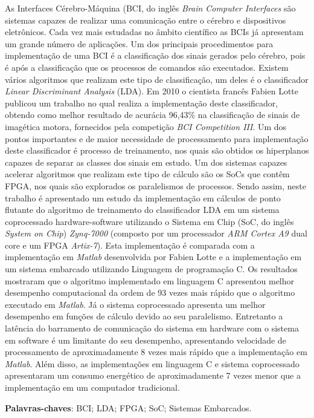 \begin{resumo}

As Interfaces Cérebro-Máquina (BCI, do inglês \textit{Brain Computer Interfaces} são sistemas capazes de realizar uma comunicação entre o cérebro e dispositivos eletrônicos. Cada vez mais estudadas no âmbito científico as BCIs já apresentam um grande número de aplicações. Um dos principais procedimentos para implementação de uma BCI é a classificação dos sinais gerados pelo cérebro, pois é após a classificação que os processos de comandos são executados. Existem vários algoritmos que realizam este tipo de classificação, um deles é o classificador \textit{Linear Discriminant  Analysis} (LDA). Em 2010 o cientista francês Fabien Lotte publicou um trabalho no qual realiza a implementação deste classificador, obtendo como melhor resultado de acurácia 96,43\% na classificação de sinais de imagética motora, fornecidos pela competição \textit{BCI Competition III}. Um dos pontos importantes e de maior necessidade de processamento para implementação deste classificador é processo de treinamento, nos quais são obtidos os hiperplanos capazes de separar as classes dos sinais em estudo. Um dos sistemas capazes acelerar algoritmos que realizam este tipo de cálculo são os SoCs que contêm FPGA, nos quais são explorados os paralelismos de processos.
Sendo assim, neste trabalho é apresentado um estudo da implementação em cálculos de ponto flutante do algoritmo de treinamento do classificador LDA em um sistema coprocessado hardware-software utilizando o Sistema em Chip (SoC, do inglês \textit{System on Chip}) \textit{Zynq-7000} (composto por  um processador \textit{ARM Cortex A9} dual core e um FPGA \textit{Artix-7}). Esta implementação é comparada com a implementação em \textit{Matlab} desenvolvida por Fabien Lotte e a implementação em um sistema embarcado utilizando Linguagem de programação C. Os resultados mostraram que o algoritmo implementado em linguagem C apresentou melhor desempenho computacional da ordem de 93 vezes mais rápido que o algoritmo executado em \textit{Matlab}. Já o sistema coprocessado apresenta um melhor desempenho em funções de cálculo devido ao seu paralelismo. Entretanto a latência do barramento de comunicação do sistema em hardware com o sistema em software é um limitante do seu desempenho, apresentando velocidade de processamento de aproximadamente 8 vezes mais rápido que a implementação em \textit{Matlab}. Além disso, as implementações em linguagem C e sistema coprocessado apresentaram um consumo energético de aproximadamente 7 vezes menor que a implementação em um computador tradicional.


 \vspace{\onelineskip}
 
 \noindent
 \textbf{Palavras-chaves}: BCI; LDA; FPGA; SoC; Sistemas Embarcados.
\end{resumo}

